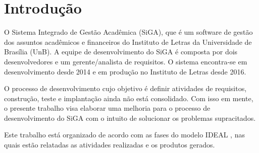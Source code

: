 \chapter{Introdução}

O Sistema Integrado de Gestão Acadêmica (SiGA), que é um software de gestão dos assuntos
acadêmicos e financeiros do Instituto de Letras da Universidade de Brasília (UnB). 
A equipe de desenvolvimento do SiGA é composta por dois desenvolvedores e um gerente/analista
de requisitos. O sistema encontra-se em desenvolvimento desde 2014 e em produção no Instituto
de Letras desde 2016.

O processo de desenvolvimento cujo objetivo é definir atividades de requisitos, construção, teste e implantação ainda não 
está consolidado. Com isso em mente, o presente trabalho visa elaborar uma melhoria para o processo de desenvolvimento
do SiGA com o intuito de solucionar os problemas supracitados. 

Este trabalho está organizado de acordo com as fases do modelo IDEAL \cite{ideal}, nas quais estão relatadas as atividades
realizadas e os produtos gerados. 
